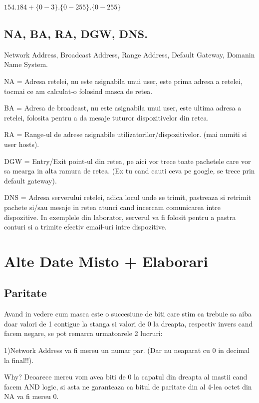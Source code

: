 \documentclass{article}
\begin{document}
\begin{center}
     $154.184+\{0-3\}.\{0-255\}.\{0-255\}$
\end{center}
 
\subsection{NA, BA, RA, DGW, DNS.}
Network Address, Broadcast Address, Range Address, Default Gateway, Domanin Name System.

NA = Adresa retelei, nu este asignabila unui user, este prima adresa a retelei, tocmai ce am calculat-o folosind masca de retea. 

BA = Adresa de broadcast, nu este asignabila unui user, este ultima adresa a retelei, folosita pentru a da mesaje tuturor dispozitivelor din retea.


RA = Range-ul de adrese asignabile utilizatorilor/dispozitivelor. (mai numiti si user hosts).

DGW = Entry/Exit point-ul din retea, pe aici vor trece toate pachetele care vor sa mearga in alta ramura de retea. (Ex tu cand cauti ceva pe google, se trece prin default gateway). 

DNS = Adresa serverului retelei, adica locul unde se trimit, pastreaza si retrimit pachete si/sau mesaje in retea atunci cand incercam comunicarea intre dispozitive. In exemplele din laborator, serverul va fi folosit pentru a pastra conturi si a trimite efectiv email-uri intre dispozitive.


\newpage


\section{Alte Date Misto + Elaborari}

\subsection{Paritate}
Avand in vedere cum masca este o succesiune de biti care stim ca trebuie sa aiba doar valori de 1 contigue la stanga si valori de 0 la dreapta, respectiv invers cand facem negare, se pot remarca urmatoarele 2 lucruri:

1)Network Address va fi mereu un numar par. (Dar nu neaparat cu 0 in decimal la final!!). 

Why? Deoarece mereu vom avea biti de 0 la capatul din dreapta al mastii cand facem AND logic, si asta ne garanteaza ca bitul de paritate din al 4-lea octet din NA va fi mereu 0.
\end{document}
